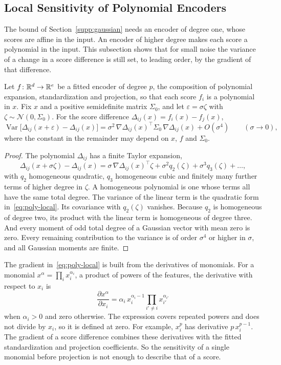 \subsection{Local Sensitivity of Polynomial Encoders}\label{supp:poly}

The bound of Section~\ref{supp:gaussian} needs an encoder of degree one, whose scores are affine in the input. An encoder of higher degree makes each score a polynomial in the input. This subsection shows that for small noise the variance of a change in a score difference is still set, to leading order, by the gradient of that difference.

Let $f\colon\mathbb{R}^d\to\mathbb{R}^e$ be a fitted encoder of degree $p$, the composition of polynomial expansion, standardization and projection, so that each score $f_i$ is a polynomial in $x$. Fix $x$ and a positive semidefinite matrix $\Sigma_0$, and let $\varepsilon=\sigma\zeta$ with $\zeta\sim\mathcal N(0,\Sigma_0)$. For the score difference $\Delta_{ij}(x)=f_i(x)-f_j(x)$,
\begin{equation}\label{eq:poly-local}
\operatorname{Var}\bigl[\Delta_{ij}(x+\varepsilon)-\Delta_{ij}(x)\bigr]=\sigma^2\,\nabla\Delta_{ij}(x)^{\top}\Sigma_0\,\nabla\Delta_{ij}(x)+O(\sigma^4)\qquad(\sigma\to0),
\end{equation}
where the constant in the remainder may depend on $x$, $f$ and $\Sigma_0$.

\begin{proof}
The polynomial $\Delta_{ij}$ has a finite Taylor expansion,
\[
\Delta_{ij}(x+\sigma\zeta)-\Delta_{ij}(x)=\sigma\,\nabla\Delta_{ij}(x)^{\top}\zeta+\sigma^2 q_2(\zeta)+\sigma^3 q_3(\zeta)+\dots,
\]
with $q_2$ homogeneous quadratic, $q_3$ homogeneous cubic and finitely many further terms of higher degree in $\zeta$. A homogeneous polynomial is one whose terms all have the same total degree. The variance of the linear term is the quadratic form in~\eqref{eq:poly-local}. Its covariance with $q_2(\zeta)$ vanishes. Because $q_2$ is homogeneous of degree two, its product with the linear term is homogeneous of degree three. And every moment of odd total degree of a Gaussian vector with mean zero is zero. Every remaining contribution to the variance is of order $\sigma^4$ or higher in $\sigma$, and all Gaussian moments are finite.
\end{proof}

The gradient in~\eqref{eq:poly-local} is built from the derivatives of monomials. For a monomial $x^{\alpha}=\prod_i x_i^{\alpha_i}$, a product of powers of the features, the derivative with respect to $x_i$ is
\[
\frac{\partial x^{\alpha}}{\partial x_i}=\alpha_i\,x_i^{\alpha_i-1}\prod_{i'\neq i}x_{i'}^{\alpha_{i'}}
\]
when $\alpha_i>0$ and zero otherwise. The expression covers repeated powers and does not divide by $x_i$, so it is defined at zero. For example, $x_i^{p}$ has derivative $p\,x_i^{p-1}$. The gradient of a score difference combines these derivatives with the fitted standardization and projection coefficients. So the sensitivity of a single monomial before projection is not enough to describe that of a score.

